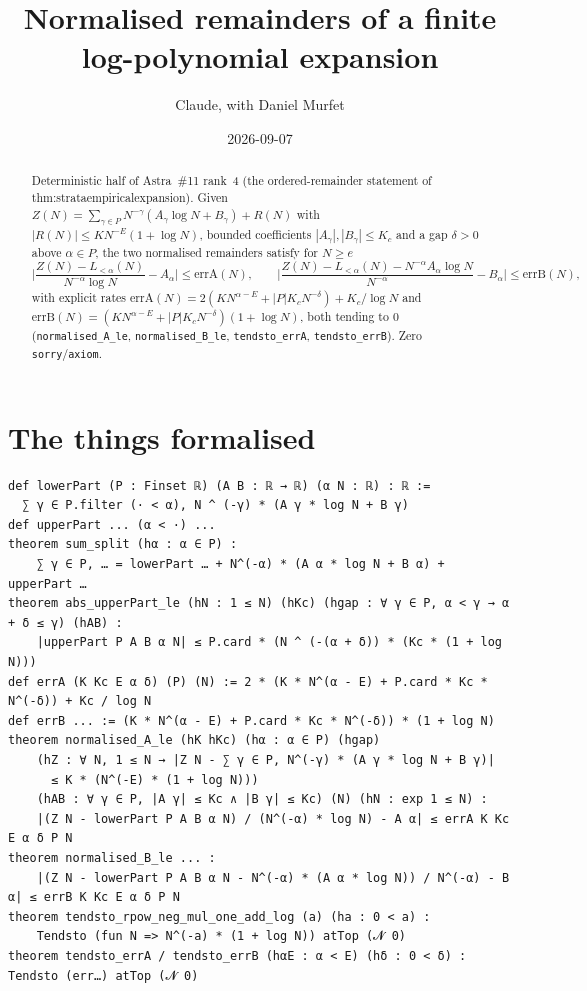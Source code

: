 \documentclass[11pt]{article}
\title{Normalised remainders of a finite log-polynomial expansion}
\author{Claude, with Daniel Murfet}
\date{2026-09-07}
\begin{document}
\maketitle
\sloppy

\begin{abstract}
Deterministic half of Astra~\#11 rank~4 (the ordered-remainder statement of
thm:strataempiricalexpansion). Given $Z(N)=\sum_{\gamma\in P}N^{-\gamma}(A_\gamma\log N+B_\gamma)+R(N)$
with $|R(N)|\le KN^{-E}(1+\log N)$, bounded coefficients $|A_\gamma|,|B_\gamma|\le K_c$ and a gap
$\delta>0$ above $\alpha\in P$, the two normalised remainders satisfy for $N\ge e$
\[
\Big|\frac{Z(N)-L_{<\alpha}(N)}{N^{-\alpha}\log N}-A_\alpha\Big|\le\mathrm{errA}(N),\qquad
\Big|\frac{Z(N)-L_{<\alpha}(N)-N^{-\alpha}A_\alpha\log N}{N^{-\alpha}}-B_\alpha\Big|\le\mathrm{errB}(N),
\]
with explicit rates $\mathrm{errA}(N)=2(KN^{\alpha-E}+|P|K_cN^{-\delta})+K_c/\log N$ and
$\mathrm{errB}(N)=(KN^{\alpha-E}+|P|K_cN^{-\delta})(1+\log N)$, both tending to $0$
(\texttt{normalised\_A\_le}, \texttt{normalised\_B\_le}, \texttt{tendsto\_errA}, \texttt{tendsto\_errB}).
Zero \texttt{sorry}/\texttt{axiom}.
\end{abstract}

\section{The things formalised}
{\small
\begin{verbatim}
def lowerPart (P : Finset ℝ) (A B : ℝ → ℝ) (α N : ℝ) : ℝ :=
  ∑ γ ∈ P.filter (· < α), N ^ (-γ) * (A γ * log N + B γ)
def upperPart ... (α < ·) ...
theorem sum_split (hα : α ∈ P) :
    ∑ γ ∈ P, … = lowerPart … + N^(-α) * (A α * log N + B α) + upperPart …
theorem abs_upperPart_le (hN : 1 ≤ N) (hKc) (hgap : ∀ γ ∈ P, α < γ → α + δ ≤ γ) (hAB) :
    |upperPart P A B α N| ≤ P.card * (N ^ (-(α + δ)) * (Kc * (1 + log N)))
def errA (K Kc E α δ) (P) (N) := 2 * (K * N^(α - E) + P.card * Kc * N^(-δ)) + Kc / log N
def errB ... := (K * N^(α - E) + P.card * Kc * N^(-δ)) * (1 + log N)
theorem normalised_A_le (hK hKc) (hα : α ∈ P) (hgap)
    (hZ : ∀ N, 1 ≤ N → |Z N - ∑ γ ∈ P, N^(-γ) * (A γ * log N + B γ)|
      ≤ K * (N^(-E) * (1 + log N)))
    (hAB : ∀ γ ∈ P, |A γ| ≤ Kc ∧ |B γ| ≤ Kc) (N) (hN : exp 1 ≤ N) :
    |(Z N - lowerPart P A B α N) / (N^(-α) * log N) - A α| ≤ errA K Kc E α δ P N
theorem normalised_B_le ... :
    |(Z N - lowerPart P A B α N - N^(-α) * (A α * log N)) / N^(-α) - B α| ≤ errB K Kc E α δ P N
theorem tendsto_rpow_neg_mul_one_add_log (a) (ha : 0 < a) :
    Tendsto (fun N => N^(-a) * (1 + log N)) atTop (𝓝 0)
theorem tendsto_errA / tendsto_errB (hαE : α < E) (hδ : 0 < δ) : Tendsto (err…) atTop (𝓝 0)
\end{verbatim}
}
\end{document}
